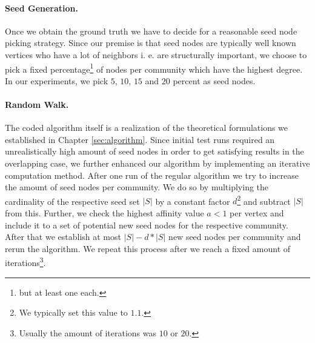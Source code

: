 \paragraph{Seed Generation.}
Once we obtain the ground truth we have to decide for a reasonable seed node 
picking strategy. Since our premise is that seed nodes are typically well known vertices who have a lot of neighbors i. e. are structurally important, we choose to pick a fixed percentage\footnote{but at least one each.} of nodes per community which have the highest degree. In our experiments, we pick $5$, $10$, $15$ and $20$ percent as seed nodes.

\paragraph{Random Walk.}
The coded algorithm itself is a realization of the theoretical formulations we 
established in Chapter \ref{sec:algorithm}. Since initial test runs required an unrealistically high amount of seed nodes in order to get satisfying results in the overlapping case, we further enhanced our algorithm by implementing an iterative computation method. After one run of the regular algorithm we try to increase the amount of seed nodes per community. We do so by multiplying the cardinality of the respective seed set $\left| S \right|$ by a constant factor $d$\footnote{We typically set this value to $1.1$.} and subtract $\left| S \right|$ from this. Further, we check the highest affinity value $a < 1$ per vertex and include it to a set of potential new seed nodes for the respective community. After that we establish at most 
$\left| S \right| - d * \left| S \right|$ new seed nodes per community and rerun the algorithm. We repeat this process after we reach a fixed amount of 
iterations\footnote{Usually the amount of iterations was $10$ or $20$.}.


